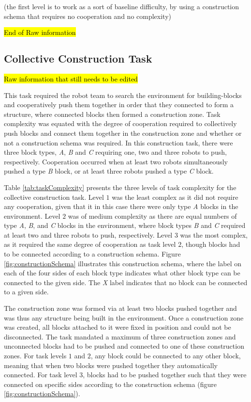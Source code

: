 \documentclass[conference]{IEEEtran}
\begin{document}
(the first level is to work as a sort of baseline difficulty, by using a construction schema that requires no cooperation and no complexity)

\hl{End of Raw information}

\subsection{Collective Construction Task}\label{subsec:constructionTask}
\hl{Raw information that still needs to be edited}

This task required the robot team to search the environment for building-blocks and
cooperatively push them together in order that they connected to form a structure,
where connected blocks then formed a construction zone.
Task complexity was equated with the degree of cooperation required to collectively
push blocks and connect them together in the construction zone and whether or not
a construction schema was required.
In this construction task, there were three block types, \textit{A}, \textit{B} and \textit{C}
requiring one, two and three robots to push, respectively.
Cooperation occurred when at least two robots simultaneously pushed a type \textit{B} block,
or at least three robots pushed a type \textit{C} block.

Table \ref{tab:taskComplexity} presents the three levels of task complexity for the
collective construction task.  Level $1$ was the least complex as it did not require
any cooperation, given that it in this case there were only type \textit{A}
blocks in the environment.
Level $2$ was of medium complexity as there are equal numbers of type \textit{A},
\textit{B}, and \textit{C} blocks in the environment, where block types \textit{B} and \textit{C} required
at least two and three robots to push, respectively.
Level $3$ was the most complex, as it required the same degree of cooperation as task level
$2$, though blocks had to be connected according to a construction schema.
Figure \ref{fig:constructionSchema}
illustrates this construction schema, where the label on each of the
four sides of each block type indicates what other block type can be connected to the given side.
The \textit{X} label indicates that no block can be connected to a given side.

The construction zone was formed via at least two blocks pushed together and
was thus any structure being built in the environment.
Once a construction zone was created, all blocks attached to it were fixed in position
and could not be disconnected.
The task mandated a maximum of three construction zones and unconnected blocks
had to be pushed and connected to one of these construction zones.
For task levels $1$ and $2$, any block could be connected to any other block,
meaning that when two blocks were pushed
together they automatically connected.
For task level $3$, blocks had to be pushed together such
that they were connected on specific sides according to the construction schema
(figure \ref{fig:constructionSchema}).
\end{document}
